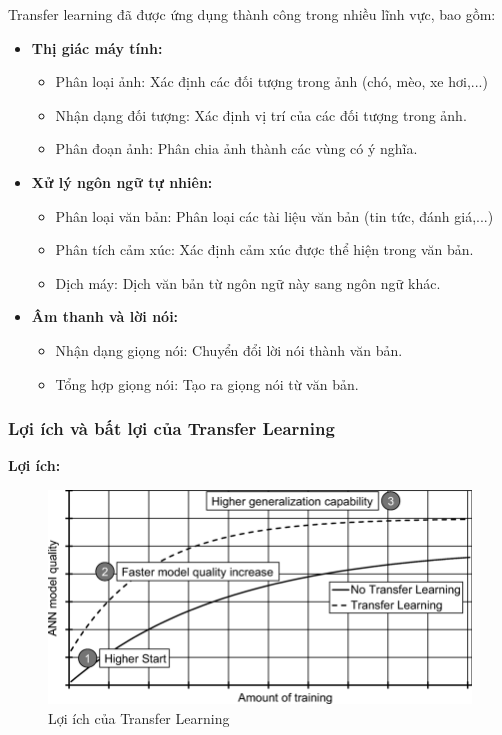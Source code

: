 Transfer learning đã được ứng dụng thành công trong nhiều lĩnh vực, bao gồm:

\begin{itemize}
    \item \textbf{Thị giác máy tính:} 
        \begin{itemize}
            \item Phân loại ảnh: Xác định các đối tượng trong ảnh (chó, mèo, xe hơi,...)
            \item Nhận dạng đối tượng: Xác định vị trí của các đối tượng trong ảnh.
            \item Phân đoạn ảnh: Phân chia ảnh thành các vùng có ý nghĩa.
        \end{itemize}
    \item \textbf{Xử lý ngôn ngữ tự nhiên:}
        \begin{itemize}
            \item Phân loại văn bản: Phân loại các tài liệu văn bản (tin tức, đánh giá,...)
            \item Phân tích cảm xúc: Xác định cảm xúc được thể hiện trong văn bản.
            \item Dịch máy: Dịch văn bản từ ngôn ngữ này sang ngôn ngữ khác.
        \end{itemize}
    \item \textbf{Âm thanh và lời nói:}
        \begin{itemize}
            \item Nhận dạng giọng nói: Chuyển đổi lời nói thành văn bản.
            \item Tổng hợp giọng nói: Tạo ra giọng nói từ văn bản.
        \end{itemize}
\end{itemize}

\subsubsection{Lợi ích và bất lợi của Transfer Learning}

\textbf{Lợi ích:}

 \begin{figure}[H]
    \centering
    \includegraphics[scale = 0.2]{Images/Theoretical basis/Possible-advantages-of-transfer-learning.png}
\caption{Lợi ích của Transfer Learning}
\end{figure}



